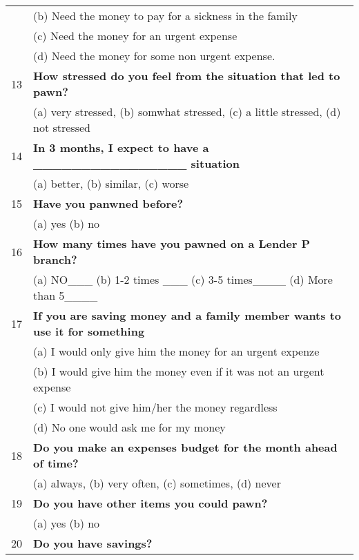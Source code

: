 \begin{tabular}{cl}
      & (b) Need the money to pay for a sickness in the family \\
      & (c) Need the money for an urgent expense \\
      & (d) Need the money for some non urgent expense. \\
\rowcolor[rgb]{ .682,  .667,  .667} 13    & \textbf{How stressed do you feel from the situation that led to pawn?} \\
      & (a) very stressed, (b) somwhat stressed, (c) a little stressed, (d) not stressed  \\
\rowcolor[rgb]{ .682,  .667,  .667} 14    & \textbf{In 3 months, I expect to have a  \_\_\_\_\_\_\_\_\_\_\_\_\_\_\_\_ situation} \\
      & (a) better, (b) similar,  (c) worse \\
\rowcolor[rgb]{ .682,  .667,  .667} 15    & \textbf{Have you panwned before?} \\
      & (a) yes  (b) no \\
\rowcolor[rgb]{ .682,  .667,  .667} 16    & \textbf{How many times have you pawned on a Lender P branch?} \\
      & (a) NO\_\_\_    (b)  1-2 times \_\_\_    (c) 3-5 times\_\_\_\_   (d) More than 5\_\_\_\_ \\
\rowcolor[rgb]{ .682,  .667,  .667} 17    & \multicolumn{1}{p{54.91em}}{\textbf{If you are saving money and a family member wants to use it for something }} \\
      & \multicolumn{1}{p{54.91em}}{(a) I would only give him the money for an urgent expenze} \\
      & \multicolumn{1}{p{54.91em}}{(b) I would give him the money even if it was not an urgent expense} \\
      & \multicolumn{1}{p{54.91em}}{(c) I would not give him/her the money regardless} \\
      & \multicolumn{1}{p{54.91em}}{(d) No one would ask me for my money} \\
\rowcolor[rgb]{ .682,  .667,  .667} 18    & \textbf{Do you make an expenses budget for the month ahead of time?} \\
      & (a) always, (b) very often, (c) sometimes, (d) never \\
19    & \multicolumn{1}{p{54.91em}}{\textbf{Do you have other items you could pawn?}} \\
      & (a) yes  (b) no \\
\rowcolor[rgb]{ .682,  .667,  .667} 20    & \textbf{Do you have savings?} \\

\end{tabular}
